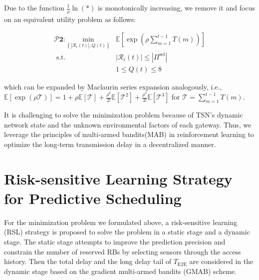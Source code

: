 \documentclass{SCIS2021}
\begin{document}
	\par Due to the function $\frac{1}{\rho} \ln \left(*\right)$ is monotonically increasing, we remove it and focus on an equivalent utility problem as follows:

	\setlength\abovedisplayskip{-16pt}
	\begin{center}
		\begin{equation}
			\label{p2}
			\begin{aligned}
				\bm{\mathcal{P}2:} \underset{\left\{\left|\mathcal{R}_\mathrm{r}(t)\right|, Q(t)\right\}}{\mathrm{min}} &\mathbb{E}[\exp (\rho \sum_{m=1}^{t-1} T(m))] \\
				\text { s.t. } &\left|\mathcal{R}_\mathrm{r}(t)\right| \leq\left| \Pi^\text{sel} \right|  \\
				&1 \leq Q(t) \leq 8
			\end{aligned}
		\end{equation}
	\end{center}
	\setlength\belowdisplayskip{-8pt}

	\vspace{-5pt}
	\noindent which can be expanded by Maclaurin series expansion analogously, i.e., $\mathbb{E}[\exp (\rho \mathcal{T})] = 1 + \rho \mathbb{E}[\mathcal{T}] + \frac{\rho^2}{2!} \mathbb{E}[\mathcal{T}^2] + \frac{\rho^3}{3!} \mathbb{E}[\mathcal{T}^3]$ for $\mathcal{T} = \sum_{m=1}^{t-1} T(m)$.

	\par It is challenging to solve the minimization problem because of TSN's dynamic network state and the unknown environmental factors of each gateway. Thus, we leverage the principles of multi-armed bandits(MAB) in reinforcement learning to optimize the long-term transmission delay in a decentralized manner.

	\section{Risk-sensitive Learning Strategy for Predictive Scheduling}
	\label{learning}
	For the minimization problem we formulated above, a risk-sensitive learning (RSL) strategy is proposed to solve the problem in a static stage and a dynamic stage. The static stage attempts to improve the prediction precision and constrain the number of reserved RBs by selecting sensors through the access history. Then the total delay and the long delay tail of $T_\text{E2E}$ are considered in the dynamic stage based on the gradient multi-armed bandits (GMAB) scheme.
\end{document}
